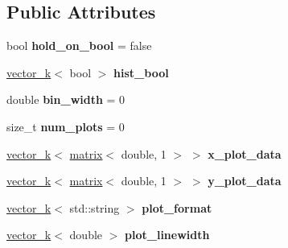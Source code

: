\subsection*{Public Attributes}
\begin{DoxyCompactItemize}
\item 
\hypertarget{classkeycpp_1_1_plots_afe961c1f35d88bc181bd426fc47ade00}{bool {\bfseries hold\-\_\-on\-\_\-bool} = false}\label{classkeycpp_1_1_plots_afe961c1f35d88bc181bd426fc47ade00}

\item 
\hypertarget{classkeycpp_1_1_plots_a2ca8aa3e36820c128a2d43b8c4349940}{\hyperlink{classkeycpp_1_1vector__k}{vector\-\_\-k}$<$ bool $>$ {\bfseries hist\-\_\-bool}}\label{classkeycpp_1_1_plots_a2ca8aa3e36820c128a2d43b8c4349940}

\item 
\hypertarget{classkeycpp_1_1_plots_a69bc4d0c87b7467113e164f592321fa5}{double {\bfseries bin\-\_\-width} = 0}\label{classkeycpp_1_1_plots_a69bc4d0c87b7467113e164f592321fa5}

\item 
\hypertarget{classkeycpp_1_1_plots_ad3b0aabd8ea6dc14a690fe6b1e37852d}{size\-\_\-t {\bfseries num\-\_\-plots} = 0}\label{classkeycpp_1_1_plots_ad3b0aabd8ea6dc14a690fe6b1e37852d}

\item 
\hypertarget{classkeycpp_1_1_plots_afcf9625ba05d1814a1f452525a1171a1}{\hyperlink{classkeycpp_1_1vector__k}{vector\-\_\-k}$<$ \hyperlink{classkeycpp_1_1matrix}{matrix}$<$ double, 1 $>$ $>$ {\bfseries x\-\_\-plot\-\_\-data}}\label{classkeycpp_1_1_plots_afcf9625ba05d1814a1f452525a1171a1}

\item 
\hypertarget{classkeycpp_1_1_plots_a4f4dca5ee8235c6c698a0eb0b7fa2f17}{\hyperlink{classkeycpp_1_1vector__k}{vector\-\_\-k}$<$ \hyperlink{classkeycpp_1_1matrix}{matrix}$<$ double, 1 $>$ $>$ {\bfseries y\-\_\-plot\-\_\-data}}\label{classkeycpp_1_1_plots_a4f4dca5ee8235c6c698a0eb0b7fa2f17}

\item 
\hypertarget{classkeycpp_1_1_plots_a8665d63b8f7098941f9c6e9369edae3c}{\hyperlink{classkeycpp_1_1vector__k}{vector\-\_\-k}$<$ std\-::string $>$ {\bfseries plot\-\_\-format}}\label{classkeycpp_1_1_plots_a8665d63b8f7098941f9c6e9369edae3c}

\item 
\hypertarget{classkeycpp_1_1_plots_a5229077ae64f278530c2c153c6925e7d}{\hyperlink{classkeycpp_1_1vector__k}{vector\-\_\-k}$<$ double $>$ {\bfseries plot\-\_\-linewidth}}\label{classkeycpp_1_1_plots_a5229077ae64f278530c2c153c6925e7d}


\end{DoxyCompactItemize}

